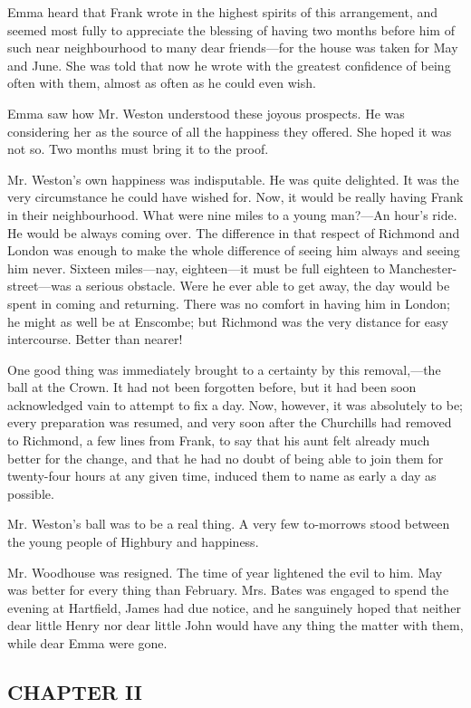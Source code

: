 Emma heard that Frank wrote in the highest spirits of this arrangement, and seemed most fully to appreciate the blessing of having two months before him of such near neighbourhood to many dear friends---for the house was taken for May and June. She was told that now he wrote with the greatest confidence of being often with them, almost as often as he could even wish.

Emma saw how Mr. Weston understood these joyous prospects. He was considering her as the source of all the happiness they offered. She hoped it was not so. Two months must bring it to the proof.

Mr. Weston's own happiness was indisputable. He was quite delighted. It was the very circumstance he could have wished for. Now, it would be really having Frank in their neighbourhood. What were nine miles to a young man?---An hour's ride. He would be always coming over. The difference in that respect of Richmond and London was enough to make the whole difference of seeing him always and seeing him never. Sixteen miles---nay, eighteen---it must be full eighteen to Manchester-street---was a serious obstacle. Were he ever able to get away, the day would be spent in coming and returning. There was no comfort in having him in London; he might as well be at Enscombe; but Richmond was the very distance for easy intercourse. Better than nearer!

One good thing was immediately brought to a certainty by this removal,---the ball at the Crown. It had not been forgotten before, but it had been soon acknowledged vain to attempt to fix a day. Now, however, it was absolutely to be; every preparation was resumed, and very soon after the Churchills had removed to Richmond, a few lines from Frank, to say that his aunt felt already much better for the change, and that he had no doubt of being able to join them for twenty-four hours at any given time, induced them to name as early a day as possible.

Mr. Weston's ball was to be a real thing. A very few to-morrows stood between the young people of Highbury and happiness.

Mr. Woodhouse was resigned. The time of year lightened the evil to him. May was better for every thing than February. Mrs. Bates was engaged to spend the evening at Hartfield, James had due notice, and he sanguinely hoped that neither dear little Henry nor dear little John would have any thing the matter with them, while dear Emma were gone.

\subsection[chapter-ii-2]{\useURL[url40][][][]\from[url40]CHAPTER II}

